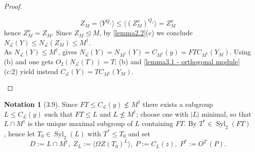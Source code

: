\documentclass{amsart}
\numberwithin{equation}{section}
\theoremstyle{definition}
\newtheorem{notation}[equation]{Notation}
\theoremstyle{subresult}
\theoremstyle{caseresult}
\renewcommand{\L}{\mathcal{L}}
\newcommand{\Syl}{\operatorname{Syl}}
\newcommand{\norm}{\trianglelefteq}
\newcommand{\<}{\langle}
\renewcommand{\>}{\rangle}
\begin{document}
\begin{proof}
\begin{enumerate}[(a)]
		\[
		Z_M = \< Y^{Q_z} \> \le \< (Z_M^x)^{Q_z} \> = Z_M^x
		\]
		hence $Z_M^x = Z_M$. Since $Z_M \norm M$, by \ref{lemma2.2}(c) we conclude $N_\L(Y) \le N_\L(Z_M) \le M^\dagger$.\\
		As $N_\L(Y) \le M^\dagger$, \cite[Lemma 3.4(k)]{Meier-Stell-Stroth:2012} gives $N_\L(Y)= N_{M^\dagger}(Y) =C_{M^\dagger}(y) = FTC_{M^\dagger}(Y_M)$. Using (b) and \cite[Lemma 3.4(e)]{Meier-Stell-Stroth:2012} one gets $O_2(N_\L(T))=T$; (b) and \ref{lemma3.1 - orthogonal module}(c:2) yield instead $C_\L(Y) = TC_{M^\dagger}(Y_M)$.
	\end{enumerate}
\end{proof}

\begin{notation}[3.9]\label{notation3.9}
	Since $FT \le C_\L(y) \not \le M^\dagger$ there exists a subgroup $L \le C_\L(y)$ such that $FT \le L$ and $L \not \le M^\dagger$; choose one with $|L|$ minimal, so that $L \cap M^\dagger$ is the unique maximal subgroup of $L$ containing $FT$. By \cite[Lemma 3.4(c)]{Meier-Stell-Stroth:2012} $T^* \in \Syl_2(FT)$, hence let $T_0 \in \Syl_2(L)$ with $T^* \le T_0$ and set
	\[
	D:= L \cap M^\dagger, \; Z_L := \< \Omega Z(T_0) ^L \>, \; P:= C_L(z), \; P^*:= O^{2'}(P).
	\]
\end{notation}
\end{document}
